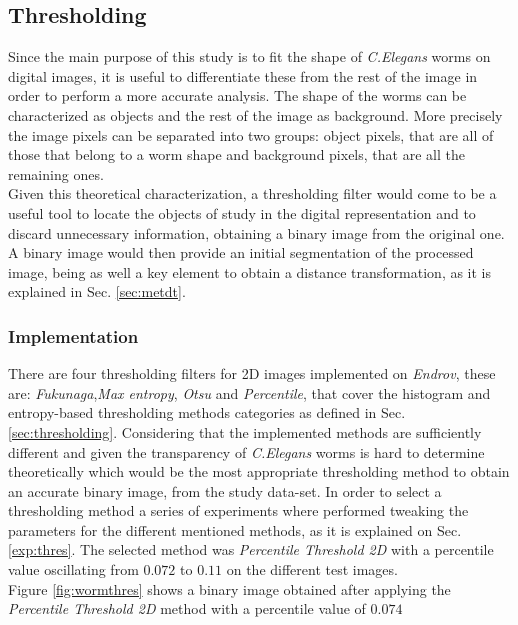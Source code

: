   

\subsection{Thresholding}
\label{sec:metthres}

Since the main purpose of this study is to fit the shape of \emph{C.Elegans} worms on digital
images, it is useful to differentiate these from the rest of the image in order to perform a more 
accurate analysis. The shape of the worms
can be characterized as objects and the rest of the image as background. More precisely
the image pixels can be separated into two groups: object pixels, that are all of those
that belong to a worm shape and background pixels, that are all the remaining ones.\\

Given this theoretical characterization, a thresholding filter would come to be a useful tool 
to locate the objects of study in the digital representation and to discard unnecessary 
information, obtaining a binary image from the original one. A binary image would then provide
an initial segmentation of the processed image, being as well a key element to obtain
a distance transformation, as it is explained in Sec. \ref{sec:metdt}.

\subsubsection{Implementation}
\label{sec:thresimp}
There are four thresholding filters for 2D images implemented on \emph{Endrov}, these are: 
\emph{Fukunaga},\emph{Max entropy}, \emph{Otsu} and \emph{Percentile}, that cover the 
histogram and entropy-based thresholding methods categories as defined in Sec.\ref{sec:thresholding}.
Considering that the implemented methods are sufficiently different and given the transparency
of \emph{C.Elegans} worms is hard to determine theoretically which would be the most appropriate 
thresholding method to obtain an accurate binary image, from the study data-set. In order 
to select a thresholding method a series of experiments where performed tweaking the parameters
for the different mentioned methods, as it is explained on Sec.\ref{exp:thres}.
The selected method was \emph{Percentile Threshold 2D} with a percentile value oscillating from
$0.072$ to $0.11$ on the different test images.\\

Figure \ref{fig:wormthres} shows a binary image obtained after applying
the \emph{Percentile Threshold 2D} method with a percentile value of $0.074$


